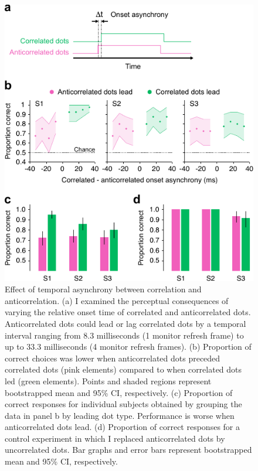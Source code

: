 \begin{figure}
  \centering
  \includegraphics{Fig6}
  \caption[Effect of temporal asynchrony between correlation and anticorrelation.]{Effect of temporal asynchrony between correlation and anticorrelation. (a) I examined the perceptual consequences of varying the relative onset time of correlated and anticorrelated dots. Anticorrelated dots could lead or lag correlated dots by a temporal interval ranging from 8.3 milliseconds (1 monitor refresh frame) to up to 33.3 milliseconds (4 monitor refresh frames). (b) Proportion of correct choices was lower when anticorrelated dots preceded correlated dots (pink elements) compared to when correlated dots led (green elements). Points and shaded regions represent bootstrapped mean and 95\% CI, respectively. (c) Proportion of correct responses for individual subjects obtained by grouping the data in panel b by leading dot type. Performance is worse when anticorrelated dots lead. (d) Proportion of correct responses for a control experiment in which I replaced anticorrelated dots by uncorrelated dots. Bar graphs and error bars represent bootstrapped mean and 95\% CI, respectively.}
  \label{fig:c2f6}
\end{figure}


